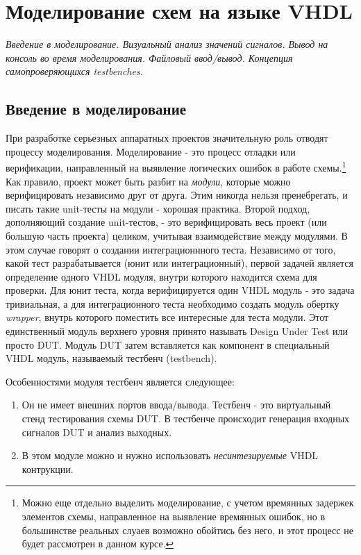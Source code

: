 \chapter{Моделирование схем на языке VHDL}

\emph{Введение в моделирование. Визуальный анализ значений сигналов. Вывод на консоль во время моделирования. Файловый ввод/вывод. Концепция самопроверяющихся testbenches.}

\section{Введение в моделирование}

При разработке серьезных аппаратных проектов значительную роль отводят процессу моделирования. Моделирование - это процесс отладки или верификации, направленный на выявление логических ошибок в работе схемы.\footnote{Можно еще отдельно выделить моделирование, с учетом времянных задержек элементов схемы, направленное на выявление времянных ошибок, но в большинстве реальных слуаев возможно обойтись без него, и этот процесс не будет рассмотрен в данном курсе.} Как правило, проект может быть разбит на \emph{модули}, которые можно верифицировать независимо друг от друга. Этим никогда нельзя пренебрегать, и писать такие unit-тесты на модули - хорошая практика. Второй подход, дополняющий создание unit-тестов, - это верифицировать весь проект (или большую часть проекта) целиком, учитывая взаимодействие между модулями. В этом случае говорят о создании интеграционнного теста.
Независимо от того, какой тест разрабатывается (юнит или интеграционный), первой задачей является определение одного VHDL модуля, внутри которого находится схема для проверки. Для юнит теста, когда верифицируется один VHDL модуль - это задача тривиальная, а для интеграционного теста необходимо создать модуль обертку \emph{wrapper}, внутрь которого поместить все интересные для теста модули. Этот единственный модуль верхнего уровня принято называть Design Under Test или просто DUT. 
Модуль DUT затем вставляется как компонент в специальный VHDL модуль, называемый тестбенч (testbench). 

Особенностями модуля тестбенч является следующее:
\begin{enumerate}
\item Он не имеет внешних портов ввода/вывода. Тестбенч - это виртуальный стенд тестирования схемы DUT. В тестбенче происходит генерация входных сигналов DUT и анализ выходных.
\item В этом модуле можно и нужно использовать \emph{несинтезируемые} VHDL контрукции. 
\end{enumerate}

